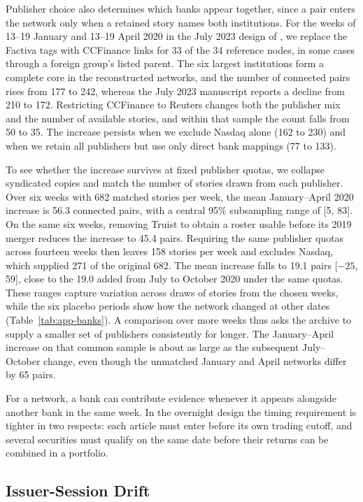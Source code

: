 Publisher choice also determines which banks appear together, since
a pair enters the network only when a retained story names both
institutions. For the weeks of 13--19 January and 13--19 April 2020
in the July 2023 design of \citet{kazinnik2023ms,kazinnik2026}, we
replace the Factiva tags with CCFinance links for 33 of the 34 reference
nodes, in some cases through a foreign group's listed parent. The six
largest institutions form a complete core in the reconstructed networks,
and the number of connected pairs rises from 177 to 242, whereas the
July 2023 manuscript reports a decline from 210 to 172. Restricting
CCFinance to Reuters changes both the publisher mix and the number of
available stories, and within that sample the count falls from 50 to
35. The increase persists when we exclude Nasdaq alone (162 to 230)
and when we retain all publishers but use only direct bank mappings
(77 to 133).

To see whether the increase survives at fixed publisher quotas, we
collapse syndicated copies and match the number of stories drawn from
each publisher. Over six weeks with 682 matched stories per week, the
mean January--April 2020 increase is 56.3 connected pairs, with a
central 95\% subsampling range of [5, 83]. On the same six weeks,
removing Truist to obtain a roster usable before its 2019 merger reduces
the increase to 45.4 pairs. Requiring the same publisher quotas across
fourteen weeks then leaves 158 stories per week and excludes Nasdaq,
which supplied 271 of the original 682. The mean increase falls to
19.1 pairs [$-25$, 59], close to the 19.0 added from July to October
2020 under the same quotas. These ranges capture variation across
draws of stories from the
chosen weeks, while the six placebo periods show how the network
changed at other dates (Table~\ref{tab:app-banks}). A comparison over
more weeks thus asks the archive to supply a smaller set of publishers
consistently for longer. The January--April increase on that common
sample is about as large as the subsequent July--October change, even
though the unmatched January and April networks differ by 65 pairs.

For a network, a bank can contribute evidence whenever it appears
alongside another bank in the same week. In the overnight design the
timing requirement is tighter in two respects: each article must enter
before its own trading cutoff, and several securities must qualify on
the same date before their returns can be combined in a portfolio.

\subsection{Issuer-Session Drift}

